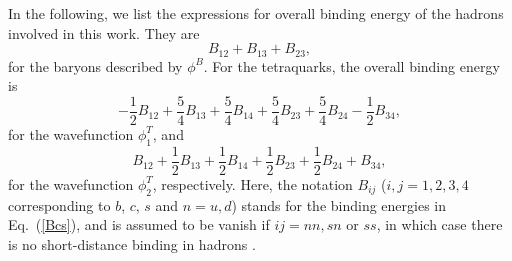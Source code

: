 \documentclass[12pt,prd,onecolumn,floatfix,nofootinbib]{revtex4}
\begin{document}
In the following, we list the expressions for overall binding energy of the
hadrons involved in this work. They are
\begin{equation}
B_{12}+B_{13}+B_{23},  \label{phbinding}
\end{equation}%
for the baryons described by $\phi ^{B}$. For the tetraquarks, the overall
binding energy is
\begin{equation}
-\frac{1}{2}B_{12}+\frac{5}{4}B_{13}+\frac{5}{4}B_{14}+\frac{5}{4}B_{23}+%
\frac{5}{4}B_{24}-\frac{1}{2}B_{34},  \label{ph1binding}
\end{equation}%
for the wavefunction $\phi _{1}^{T}$, and
\begin{equation}
B_{12}+\frac{1}{2}B_{13}+\frac{1}{2}B_{14}+\frac{1}{2}B_{23}+\frac{1}{2}%
B_{24}+B_{34},  \label{ph2binding}
\end{equation}%
for the wavefunction $\phi _{2}^{T}$, respectively. Here, the notation $%
B_{ij}$ ($i,j=1,2,3,4$ corresponding to $b$, $c$, $s$ and $n=u,d$) stands for
the binding energies in Eq.~(\ref{Bcs}), and is assumed to be vanish if $%
ij=nn,sn$ or $ss$, in which case there is no short-distance binding in
hadrons \cite{KR:2014gca}.
\end{document}
